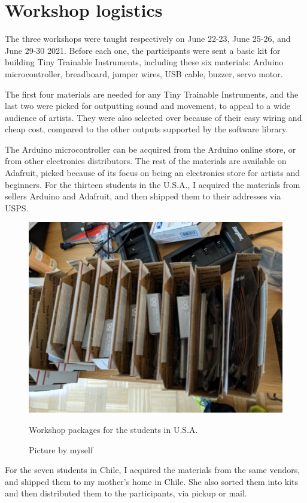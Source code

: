 \section{Workshop logistics}

The three workshops were taught respectively on June 22-23, June 25-26, and June 29-30 2021. Before each one, the participants were sent a basic kit for building Tiny Trainable Instruments, including these six materials: Arduino microcontroller, breadboard, jumper wires, USB cable, buzzer, servo motor.

The first four materials are needed for any Tiny Trainable Instruments, and the last two were picked for outputting sound and movement, to appeal to a wide audience of artists. They were also selected over because of their easy wiring and cheap cost, compared to the other outputs supported by the software library.

The Arduino microcontroller can be acquired from the Arduino online store, or from other electronics distributors. The rest of the materials are available on Adafruit, picked because of its focus on being an electronics store for artists and beginners. For the thirteen students in the U.S.A., I acquired the materials from sellers Arduino and Adafruit, and then shipped them to their addresses via \acrfull{USPS}.

\begin{figure}[ht]
  \centering
  \includegraphics[width=0.75\linewidth,height=0.25\textheight,keepaspectratio]{images/workshop-packages.jpg}
  \caption{Workshop packages for the students in U.S.A.}
  \caption*{Picture by myself}
  \label{fig:workshop-packages-usa}
\end{figure}

For the seven students in Chile, I acquired the materials from the same vendors, and shipped them to my mother's home in Chile. She also sorted them into kits and then distributed them to the participants, via pickup or mail.

